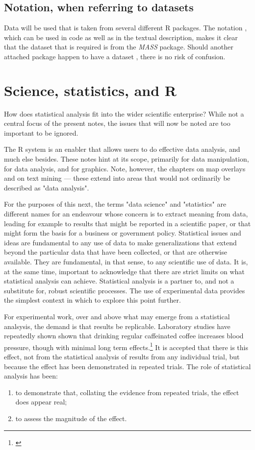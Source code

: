 \subsection*{Notation, when referring to datasets}

Data will be used that is taken from several different R packages.
The notation , which can be used in code as well
as in the textual description, makes it clear that the dataset
 that is required is from the {\em MASS} package.
Should another attached package happen to have a dataset
, there is no risk of confusion.

\section{Science, statistics, and R}

How does statistical analysis fit into the wider scientific
enterprise? While not a central focus of the present notes, 
the issues that will now be noted are too important to be
ignored.

The R system is an enabler that allows users to do effective
data analysis, and much else besides.  These notes hint at
its scope, primarily for data manipulation, for data analysis,
and for graphics.  Note, however, the chapters on map overlays
and on text mining --- these extend into areas that would not
ordinarily be described as "data analysis".

For the purposes of this next, the terms "data science" and
"statistics" are different names for an endeavour whose concern
is to extract meaning from data, leading for example to results
that might be reported in a scientific paper, or that might form
the basis for a business or government policy.  Statistical
issues and ideas are fundamental to any use of data to make
generalizations that extend beyond the particular data that
have been collected, or that are otherwise available.  They are
fundamental, in that sense, to any scientific use of data.
It is, at the same time, important to acknowledge that there
are strict limits on what statistical analysis can achieve.
Statistical analysis is a partner to, and not a substitute
for, robust scientific processes.  The use of experimental data
provides the simplest context in which to explore this point
further.

For experimental work, over and above what may emerge from a
statistical analsysis, the demand is that results be replicable.
Laboratory studies have repeatedly shown shown that drinking
regular caffeinated coffee increases blood pressure, though
with minimal long term effects.\footnote{\citet{green_kirby_suls_1996}
}  It is accepted that there is
this effect, not from the statistical analysis of results from
any individual trial, but because the effect has been demonstrated
in repeated trials.  The role of statistical analysis has been:
\begin{enumerate}
\tightlist
\item to demonstrate that, collating the evidence from repeated
trials, the effect does appear real; 
\item to assess the magnitude of the effect.
\end{enumerate}

